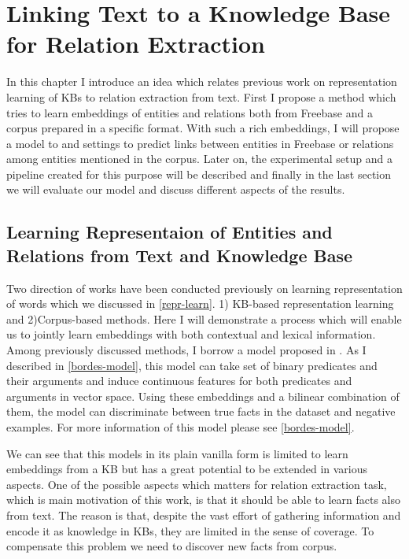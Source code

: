\chapter{Linking Text to a Knowledge Base for Relation Extraction}
\label{ch:text-kb}

In this chapter I introduce an idea which relates previous work on
representation learning of KBs to relation extraction from text. First I propose
a method which tries to learn embeddings of entities and relations both from
Freebase and a corpus prepared in a specific format. With such a rich
embeddings, I will propose a model to and settings to predict links between
entities in Freebase or relations among entities mentioned in the corpus.
Later on, the experimental setup and a pipeline created for this purpose will be
described and finally in the last section we will evaluate our model and discuss
different aspects of the results.

\section{Learning Representaion of Entities and Relations
from Text and Knowledge Base}
\label{sec:dataset}

Two direction of works have been conducted previously on learning representation
of words which we discussed in \ref{repr-learn}. 1) KB-based
representation learning and 2)Corpus-based methods. Here I will demonstrate a
process which will enable us to jointly learn embeddings with both contextual
and lexical information. Among previously discussed methods, I borrow a model
proposed in \cite{Bordes2012}. As I described in \ref{bordes-model}, this model
can take set of binary predicates and their arguments and induce continuous
features for both predicates and arguments in vector space. Using these
embeddings and a bilinear combination of them, the model can discriminate
between true facts in the dataset and negative examples. For more information of
this model please see \ref{bordes-model}.

We can see that this models in its plain vanilla form is limited to learn
embeddings from a KB but has a great potential to be extended in various
aspects. One of the possible aspects which matters for relation extraction task,
which is main motivation of this work, is that it should be able to learn facts
also from text. The reason is that, despite the vast effort of gathering
information and encode it as knowledge in KBs, they are limited in the sense of
coverage. To compensate this problem we need to discover new facts from corpus.

